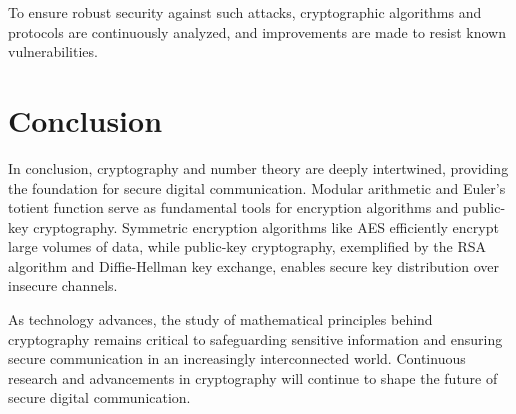 \documentclass{article}
\begin{document}
To ensure robust security against such attacks, cryptographic algorithms and protocols are continuously analyzed, and improvements are made to resist known vulnerabilities.

\section{Conclusion}
In conclusion, cryptography and number theory are deeply intertwined, providing the foundation for secure digital communication. Modular arithmetic and Euler's totient function serve as fundamental tools for encryption algorithms and public-key cryptography. Symmetric encryption algorithms like AES efficiently encrypt large volumes of data, while public-key cryptography, exemplified by the RSA algorithm and Diffie-Hellman key exchange, enables secure key distribution over insecure channels.

As technology advances, the study of mathematical principles behind cryptography remains critical to safeguarding sensitive information and ensuring secure communication in an increasingly interconnected world. Continuous research and advancements in cryptography will continue to shape the future of secure digital communication.
\end{document}
